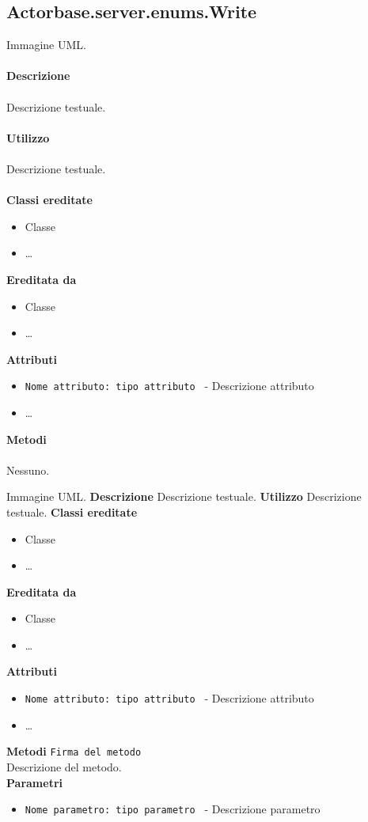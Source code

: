\documentclass[a4paper]{article}
\begin{document}
	\subsection{Actorbase.server.enums.Write}
		Immagine UML.
		\\ \\
		\textbf{Descrizione}
			\\ \\
			Descrizione testuale.
			\\ \\
		\textbf{Utilizzo}
			\\ \\
			Descrizione testuale.
			\\ \\
		\textbf{Classi ereditate}
			\begin{itemize}
				\item Classe
				\item \dots
			\end{itemize}
		\textbf{Ereditata da}
			\begin{itemize}
				\item Classe
				\item \dots
			\end{itemize}
		\textbf{Attributi}
			\begin{itemize}
				\item \texttt{Nome attributo: tipo attributo } - Descrizione attributo
				\item \dots
			\end{itemize}
		\textbf{Metodi}
			\\ \\
			Nessuno.
	
		Immagine UML.
		\textbf{Descrizione}
			Descrizione testuale.
		\textbf{Utilizzo}
			Descrizione testuale.
		\textbf{Classi ereditate}
			\begin{itemize}
				\item Classe
				\item \dots
			\end{itemize}
		\textbf{Ereditata da}
			\begin{itemize}
				\item Classe
				\item \dots
			\end{itemize}
		\textbf{Attributi}
			\begin{itemize}
				\item \texttt{Nome attributo: tipo attributo } - Descrizione attributo
				\item \dots
			\end{itemize}
		\textbf{Metodi}
			\texttt{Firma del metodo}
			\\
			Descrizione del metodo.
			\\ 
			\textbf{Parametri}
			\begin{itemize}
				\item \texttt{Nome parametro: tipo parametro } - Descrizione parametro
			\end{itemize}		
		
\end{document}
